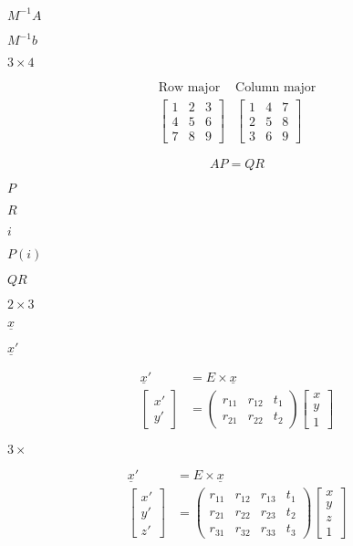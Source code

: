 \documentclass{article}
\begin{document}
$M^{-1}A$
\pagebreak

$M^{-1}b$
\pagebreak

$3\times4$
\pagebreak

\[\begin{matrix}\text{Row major} & \text {Column major}\\ \begin{bmatrix}1&2&3\\4&5&6\\7&8&9\end{bmatrix} & \begin{bmatrix}1&4&7\\2&5&8\\3&6&9\end{bmatrix} \end{matrix}\]
\pagebreak

\[ AP = QR \]
\pagebreak

$P$
\pagebreak

$R$
\pagebreak

$i$
\pagebreak

$P(i)$
\pagebreak

$QR$
\pagebreak

$2\times 3$
\pagebreak

$\underline{x}$
\pagebreak

$\underline{x}'$
\pagebreak

\[\begin{aligned}\underline{x}' &= E\times\underline{x}\\ \begin{bmatrix}x'\\y'\end{bmatrix} &= \begin{pmatrix}r_{11} & r_{12} & t_1\\r_{21} & r_{22} & t_2\end{pmatrix}\begin{bmatrix}x\\y\\1\end{bmatrix}\end{aligned}\]
\pagebreak

$3\times$
\pagebreak

\[\begin{aligned}\underline{x}' &= E\times\underline{x}\\ \begin{bmatrix}x'\\y'\\z'\end{bmatrix} &= \begin{pmatrix}r_{11} & r_{12} & r_{13} & t_1\\r_{21} & r_{22} & r_{23} & t_2\\r_{31} & r_{32} & r_{33} & t_3\end{pmatrix}\begin{bmatrix}x\\y\\z\\1\end{bmatrix}\end{aligned}\]
\pagebreak
\end{document}
